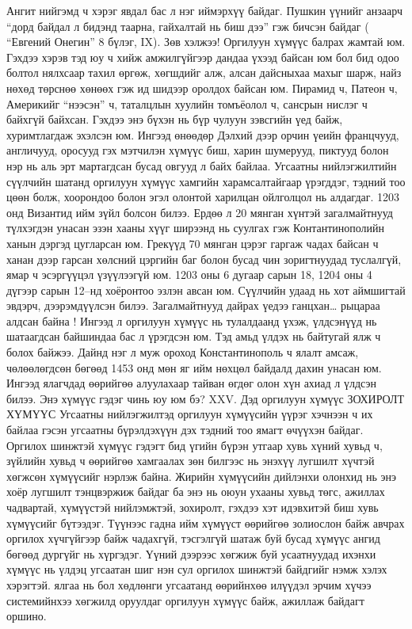 Ангит нийгэмд ч хэрэг явдал бас л нэг иймэрхүү байдаг. Пушкин үүнийг анзаарч “дорд байдал л бидэнд таарна, гайхалтай нь биш дээ” гэж бичсэн байдаг ( “Евгений Онегин” 8 бүлэг, IX).
Зөв хэлжээ! Оргилуун хүмүүс балрах жамтай юм. Гэхдээ хэрэв тэд юу ч хийж амжилгүйгээр дандаа үхээд байсан юм бол бид одоо болтол нялхсаар тахил өргөж, хөгшдийг алж, алсан дайсныхаа махыг шарж, найз нөхөд төрснөө хөнөөх гэж ид шидээр оролдох байсан юм. Пирамид ч, Патеон ч, Америкийг “нээсэн” ч, таталцлын хуулийн томъёолол ч, сансрын нислэг ч байхгүй байхсан. Гэхдээ энэ бүхэн нь бүр чулуун зэвсгийн үед байж, хуримтлагдаж эхэлсэн юм. Ингээд өнөөдөр Дэлхий дээр орчин үеийн францчууд, англичууд, оросууд гэх мэтчилэн хүмүүс биш, харин шумерууд, пиктууд болон нэр нь аль эрт мартагдсан бусад овгууд л байх байлаа.
Угсаатны нийлэгжилтийн сүүлчийн шатанд оргилуун хүмүүс хамгийн харамсалтайгаар үрэгддэг, тэдний тоо цөөн болж, хоорондоо болон эгэл олонтой харилцан ойлголцол нь алдагдаг. 1203 онд Византид ийм зүйл болсон билээ. Ердөө л 20 мянган хүнтэй загалмайтнууд түлхэгдэн унасан эзэн хааны хүүг ширээнд нь суулгах гэж Контантинополийн ханын дэргэд цугларсан юм. Грекүүд 70 мянган цэрэг гаргаж чадах байсан ч ханан дээр гарсан хөлсний цэргийн баг болон бусад чин зоригтнуудад туслалгүй, ямар ч эсэргүүцэл үзүүлээгүй юм. 1203 оны 6 дугаар сарын 18, 1204 оны 4 дүгээр сарын 12–нд хоёронтоо эзлэн авсан юм. Сүүлчийн удаад нь хот аймшигтай эвдэрч, дээрэмдүүлсэн билээ. Загалмайтнууд дайрах үедээ ганцхан… рыцараа алдсан байна !
Ингээд л оргилуун хүмүүс нь тулалдаанд үхэж, үлдсэнүүд нь шатаагдсан байшиндаа бас л үрэгдсэн юм. Тэд амьд үлдэх нь байтугай ялж ч болох байжээ. Дайнд нэг л муж ороход Константинополь ч ялалт амсаж, чөлөөлөгдсөн бөгөөд 1453 онд мөн яг ийм нөхцөл байдалд дахин унасан юм. Ингээд ялагчдад өөрийгөө алуулахаар тайван өгдөг олон хүн ахиад л үлдсэн билээ. Энэ хүмүүс гэдэг чинь юу юм бэ?
XXV. Дэд оргилуун хүмүүс
ЗОХИРОЛТ ХҮМҮҮС
Угсаатны нийлэгжилтэд оргилуун хүмүүсийн үүрэг хэчнээн ч их байлаа гэсэн угсаатны бүрэлдэхүүн дэх тэдний тоо ямагт өчүүхэн байдаг. Оргилох шинжтэй хүмүүс гэдэгт бид үгийн бүрэн утгаар хувь хүний хувьд ч, зүйлийн хувьд ч өөрийгөө хамгаалах зөн билгээс нь энэхүү лугшилт хүчтэй хөгжсөн хүмүүсийг нэрлэж байна. Жирийн хүмүүсийн дийлэнхи олонхид нь энэ хоёр лугшилт тэнцвэржиж байдаг ба энэ нь оюун ухааны хувьд төгс, ажиллах чадвартай, хүмүүстэй нийлэмжтэй, зохиролт, гэхдээ хэт идэвхитэй биш хувь хүмүүсийг бүтээдэг. Түүнээс гадна ийм хүмүүст өөрийгөө золиослон байж авчрах оргилох хүчгүйгээр байж чадахгүй, тэсгэлгүй шатаж буй бусад хүмүүс ангид бөгөөд дургүйг нь хүргэдэг. Үүний дээрээс хөгжиж буй усаатнуудад ихэнхи хүмүүс нь үлдэц угсаатан шиг нэн сул оргилох шинжтэй байдгийг нэмж хэлэх хэрэгтэй. ялгаа нь бол хөдлөнги угсаатанд өөрийнхөө илүүдэл эрчим хүчээ системийнхээ хөгжилд оруулдаг оргилуун хүмүүс байж, ажиллаж байдагт оршино.
